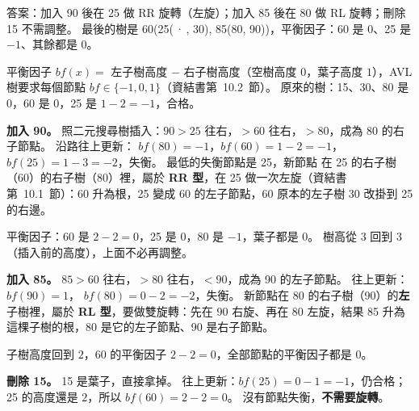 \begin{pastsoln}
答案：加入 90 後在 25 做 RR 旋轉（左旋）；加入 85 後在 80 做 RL 旋轉；刪除 15 不需調整。 最後的樹是 60(25(\,·\,, 30),
85(80, 90))，平衡因子：60 是 $0$、25 是 $-1$、其餘都是 $0$。

平衡因子 $\mathit{bf}(x) = $ 左子樹高度 $-$ 右子樹高度（空樹高度 $0$，葉子高度 $1$），AVL 樹要求每個節點
$\mathit{bf} \in \{-1, 0, 1\}$（資結書第~10.2~節）。 原來的樹：15、30、80 是 $0$，60 是 $0$，25 是 $1 - 2 = -1$，合格。

\textbf{加入 90。} 照二元搜尋樹插入：$90 > 25$ 往右，$> 60$ 往右，$> 80$，成為 80 的右子節點。 沿路往上更新：
$\mathit{bf}(80) = -1$，$\mathit{bf}(60) = 1 - 2 = -1$，$\mathit{bf}(25) = 1 - 3 = -2$，失衡。 最低的失衡節點是 25，新節點
在 25 的右子樹（60）的右子樹（80）裡，屬於 \textbf{RR 型}，在 25 做一次左旋（資結書第~10.1~節）：60 升為根，25 變成 60
的左子節點，60 原本的左子樹 30 改掛到 25 的右邊。
\begin{center}
\end{center}
平衡因子：60 是 $2 - 2 = 0$，25 是 $0$，80 是 $-1$，葉子都是 $0$。 樹高從 $3$ 回到 $3$（插入前的高度），上面不必再調整。

\textbf{加入 85。} $85 > 60$ 往右，$> 80$ 往右，$< 90$，成為 90 的左子節點。 往上更新：$\mathit{bf}(90) = 1$，
$\mathit{bf}(80) = 0 - 2 = -2$，失衡。 新節點在 80 的右子樹（90）的\textbf{左}子樹裡，屬於 \textbf{RL 型}，要做雙旋轉：先在 90
右旋、再在 80 左旋，結果 85 升為這棵子樹的根，80 是它的左子節點、90 是右子節點。
\begin{center}
\end{center}
子樹高度回到 $2$，60 的平衡因子 $2 - 2 = 0$，全部節點的平衡因子都是 $0$。

\textbf{刪除 15。} 15 是葉子，直接拿掉。 往上更新：$\mathit{bf}(25) = 0 - 1 = -1$，仍合格；25 的高度還是 $2$，所以
$\mathit{bf}(60) = 2 - 2 = 0$。 沒有節點失衡，\textbf{不需要旋轉}。


\end{pastsoln}

